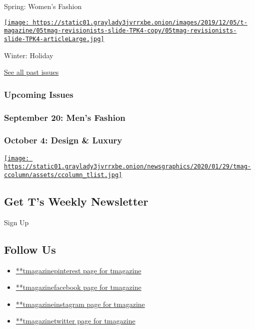 Spring: Women's Fashion

\href{https://www.nytimes3xbfgragh.onion/issue/t-magazine/2019/11/21/ts-dec-8-holiday-issue}{\texttt{[image: https://static01.graylady3jvrrxbe.onion/images/2019/12/05/t-magazine/05tmag-revisionists-slide-TPK4-copy/05tmag-revisionists-slide-TPK4-articleLarge.jpg]}}

Winter: Holiday

\href{https://www.nytimes3xbfgragh.onion/interactive/2020/t-magazine/past-issues.html}{See
all past issues}

\hypertarget{upcoming-issues}{%
\subsubsection{Upcoming Issues}\label{upcoming-issues}}

\hypertarget{september-20-mens-fashion}{%
\subsubsection{September 20: Men's
Fashion}\label{september-20-mens-fashion}}

\hypertarget{october-4-design--luxury}{%
\subsubsection{October 4: Design \&
Luxury}\label{october-4-design--luxury}}

\href{https://www.nytimes3xbfgragh.onion/newsletters/t-list}{\texttt{[image: https://static01.graylady3jvrrxbe.onion/newsgraphics/2020/01/29/tmag-ccolumn/assets/ccolumn\_tlist.jpg]}}

\hypertarget{get-ts-weekly-newsletter}{%
\subsection{Get T's Weekly Newsletter}\label{get-ts-weekly-newsletter}}

Sign Up

\hypertarget{follow-us}{%
\subsection{Follow Us}\label{follow-us}}

\begin{itemize}
\tightlist
\item
  \href{https://pinterest.com/tmagazine}{**tmagazinepinterest page for
  tmagazine}
\item
  \href{https://www.facebookcorewwwi.onion/tmagazine}{**tmagazinefacebook
  page for tmagazine}
\item
  \href{https://instagram.com/tmagazine}{**tmagazineinstagram page for
  tmagazine}
\item
  \href{https://twitter.com/tmagazine}{**tmagazinetwitter page for
  tmagazine}
\end{itemize}

